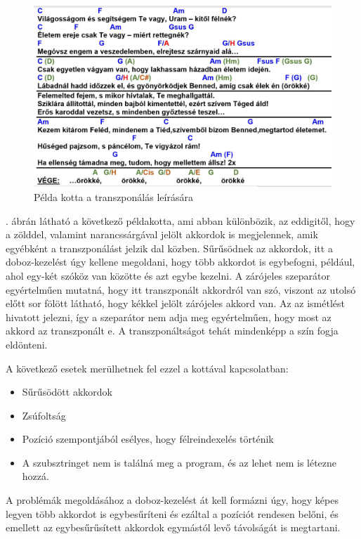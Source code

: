 \begin{figure}[h]
	\includegraphics[scale=0.3]{images/samples/27_zsoltar.jpg}
	\caption{Példa kotta a transzponálás leírására}
	\label{fig:song2}
\end{figure}

. ábrán látható a következő példakotta, ami abban különbözik, az eddigitől, hogy a zölddel, valamint narancssárgával jelölt akkordok is megjelennek, amik egyébként a transzponálást jelzik dal közben. Sűrűsödnek az akkordok, itt a doboz-kezelést úgy kellene megoldani, hogy több akkordot is egybefogni, például, ahol egy-két szóköz van közötte és azt egybe kezelni. A zárójeles szeparátor egyértelműen mutatná, hogy itt transzponált akkordról van szó, viszont az utolsó előtt sor fölött látható, hogy kékkel jelölt zárójeles akkord van. Az az ismétlést hivatott jelezni, így a szeparátor nem adja meg egyértelműen, hogy most az akkord az transzponált e. A transzponáltságot tehát mindenképp a szín fogja eldönteni.

A következő esetek merülhetnek fel ezzel a kottával kapcsolatban:
\begin{itemize}
\item Sűrűsödött akkordok
\item Zsúfoltság
\item Pozíció szempontjából esélyes, hogy félreindexelés történik
\item A szubsztringet nem is találná meg a program, és az lehet nem is létezne hozzá.
\end{itemize}

A problémák megoldásához a doboz-kezelést át kell formázni úgy, hogy képes legyen több akkordot is egybesűríteni és ezáltal a pozíciót rendesen belőni, és emellett az egybesűrűsített akkordok egymástól levő távolságát is megtartani.

